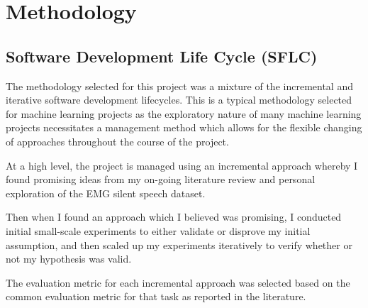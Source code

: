 \chapter{Methodology} \label{chap:Methodology}

\section{Software Development Life Cycle (SFLC)}

The methodology selected for this project was a mixture of the
incremental and iterative software development lifecycles. This
is a typical methodology selected for machine learning projects
as the exploratory nature of many machine learning projects
necessitates a management method which allows for the flexible
changing of approaches throughout the course of the project.

At a high level, the project is managed using an incremental
approach whereby I found promising ideas from my on-going
literature review and personal exploration of the EMG silent
speech dataset.

Then when I found an approach which I believed was promising,
I conducted initial small-scale experiments to either validate
or disprove my initial assumption, and then scaled up my experiments
iteratively to verify whether or not my hypothesis was valid.

The evaluation metric for each incremental approach was selected
based on the common evaluation metric for that task as reported
in the literature.